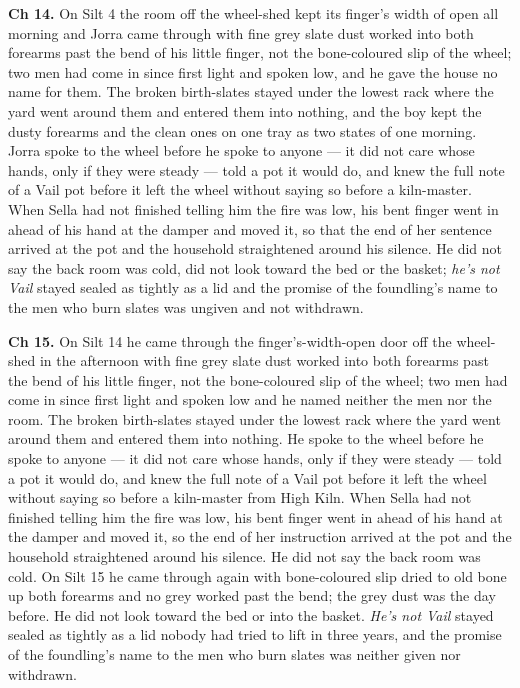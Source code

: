 \documentclass{design/chronicle}
\begin{document}
{\textbf{Ch 14.} On Silt 4 the room off the wheel-shed kept its finger’s width of open all morning and Jorra came through with fine grey slate dust worked into both forearms past the bend of his little finger, not the bone-coloured slip of the wheel; two men had come in since first light and spoken low, and he gave the house no name for them. The broken birth-slates stayed under the lowest rack where the yard went around them and entered them into nothing, and the boy kept the dusty forearms and the clean ones on one tray as two states of one morning. Jorra spoke to the wheel before he spoke to anyone — it did not care whose hands, only if they were steady — told a pot it would do, and knew the full note of a Vail pot before it left the wheel without saying so before a kiln-master. When Sella had not finished telling him the fire was low, his bent finger went in ahead of his hand at the damper and moved it, so that the end of her sentence arrived at the pot and the household straightened around his silence. He did not say the back room was cold, did not look toward the bed or the basket; \emph{he’s not Vail} stayed sealed as tightly as a lid and the promise of the foundling’s name to the men who burn slates was ungiven and not withdrawn.

\textbf{Ch 15.} On Silt 14 he came through the finger’s-width-open door off the wheel-shed in the afternoon with fine grey slate dust worked into both forearms past the bend of his little finger, not the bone-coloured slip of the wheel; two men had come in since first light and spoken low and he named neither the men nor the room. The broken birth-slates stayed under the lowest rack where the yard went around them and entered them into nothing. He spoke to the wheel before he spoke to anyone --- it did not care whose hands, only if they were steady --- told a pot it would do, and knew the full note of a Vail pot before it left the wheel without saying so before a kiln-master from High Kiln. When Sella had not finished telling him the fire was low, his bent finger went in ahead of his hand at the damper and moved it, so the end of her instruction arrived at the pot and the household straightened around his silence. He did not say the back room was cold. On Silt 15 he came through again with bone-coloured slip dried to old bone up both forearms and no grey worked past the bend; the grey dust was the day before. He did not look toward the bed or into the basket. \emph{He’s not Vail} stayed sealed as tightly as a lid nobody had tried to lift in three years, and the promise of the foundling’s name to the men who burn slates was neither given nor withdrawn.

}
\end{document}
